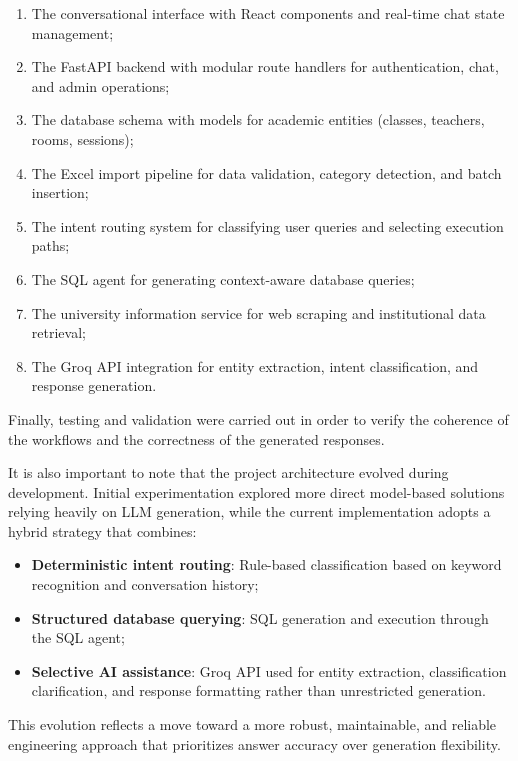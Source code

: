 \begin{enumerate}
    \item The conversational interface with React components and real-time chat state management;
    \item The FastAPI backend with modular route handlers for authentication, chat, and admin operations;
    \item The database schema with models for academic entities (classes, teachers, rooms, sessions);
    \item The Excel import pipeline for data validation, category detection, and batch insertion;
    \item The intent routing system for classifying user queries and selecting execution paths;
    \item The SQL agent for generating context-aware database queries;
    \item The university information service for web scraping and institutional data retrieval;
    \item The Groq API integration for entity extraction, intent classification, and response generation.
\end{enumerate}

Finally, testing and validation were carried out in order to verify the coherence of the workflows and the correctness of the generated responses.

It is also important to note that the project architecture evolved during development. Initial experimentation explored more direct model-based solutions relying heavily on LLM generation, while the current implementation adopts a hybrid strategy that combines:

\begin{itemize}
    \item \textbf{Deterministic intent routing}: Rule-based classification based on keyword recognition and conversation history;
    \item \textbf{Structured database querying}: SQL generation and execution through the SQL agent;
    \item \textbf{Selective AI assistance}: Groq API used for entity extraction, classification clarification, and response formatting rather than unrestricted generation.
\end{itemize}

This evolution reflects a move toward a more robust, maintainable, and reliable engineering approach that prioritizes answer accuracy over generation flexibility.

